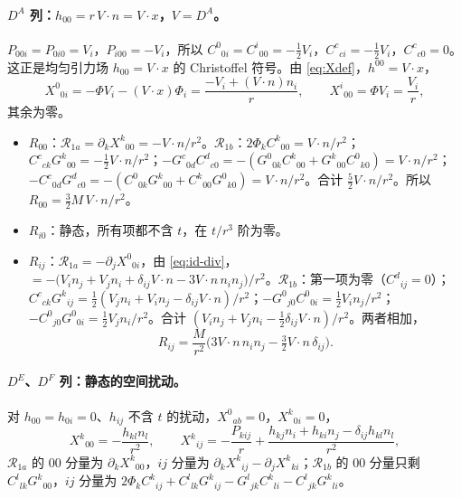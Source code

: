\documentclass[11pt,a4paper]{ctexart}
\numberwithin{equation}{section}
\begin{document}
\paragraph{$D^A$ 列：$h_{00}=r\,V\!\cdot n=V\!\cdot x$，$V=D^A$。}$P_{00i}=P_{0i0}=V_i$，$P_{i00}=-V_i$，所以 $C^0{}_{0i}=C^i{}_{00}=-\tfrac12V_i$，$C^c{}_{ci}=-\tfrac12V_i$，$C^c{}_{c0}=0$。这正是均匀引力场 $h_{00}=V\!\cdot x$ 的 Christoffel 符号。由 \eqref{eq:Xdef}，$h^{00}=V\!\cdot x$，
\begin{equation*}
X^0{}_{0i}=-\Phi V_i-(V\!\cdot x)\Phi_i=\frac{-V_i+(V\!\cdot n)n_i}{r},\qquad X^i{}_{00}=\Phi V_i=\frac{V_i}r,
\end{equation*}
其余为零。
\begin{itemize}
\item $R_{00}$：$\mathcal R_{1a}=\partial_kX^k{}_{00}=-V\!\cdot n/r^2$。$\mathcal R_{1b}$：$2\Phi_kC^k{}_{00}=V\!\cdot n/r^2$；$C^c{}_{ck}G^k{}_{00}=-\tfrac12V\!\cdot n/r^2$；$-G^c{}_{0d}C^d{}_{c0}=-(G^0{}_{0k}C^k{}_{00}+G^k{}_{00}C^0{}_{k0})=V\!\cdot n/r^2$；$-C^c{}_{0d}G^d{}_{c0}=-(C^0{}_{0k}G^k{}_{00}+C^k{}_{00}G^0{}_{k0})=V\!\cdot n/r^2$。合计 $\tfrac52V\!\cdot n/r^2$。所以 $R_{00}=\tfrac32M\,V\!\cdot n/r^2$。
\item $R_{i0}$：静态，所有项都不含 $t$，在 $t/r^3$ 阶为零。
\item $R_{ij}$：$\mathcal R_{1a}=-\partial_jX^0{}_{0i}$，由 \eqref{eq:id-div}，$=-\big(V_in_j+V_jn_i+\delta_{ij}V\!\cdot n-3V\!\cdot n\,n_in_j\big)/r^2$。$\mathcal R_{1b}$：第一项为零（$C^d{}_{ij}=0$）；$C^c{}_{ck}G^k{}_{ij}=\tfrac12(V_jn_i+V_in_j-\delta_{ij}V\!\cdot n)/r^2$；$-G^0{}_{j0}C^0{}_{0i}=\tfrac12V_in_j/r^2$；$-C^0{}_{j0}G^0{}_{0i}=\tfrac12V_jn_i/r^2$。合计 $(V_in_j+V_jn_i-\tfrac12\delta_{ij}V\!\cdot n)/r^2$。两者相加，
\begin{equation*}
R_{ij}=\frac{M}{r^2}\Big(3V\!\cdot n\,n_in_j-\tfrac32V\!\cdot n\,\delta_{ij}\Big).
\end{equation*}
\end{itemize}

\paragraph{$D^E$、$D^F$ 列：静态的空间扰动。}对 $h_{00}=h_{0i}=0$、$h_{ij}$ 不含 $t$ 的扰动，$X^0{}_{ab}=0$，$X^k{}_{0i}=0$，
\begin{equation}
X^k{}_{00}=-\frac{h_{kl}n_l}{r^2},\qquad
X^k{}_{ij}=-\frac{P_{kij}}{r}+\frac{h_{kj}n_i+h_{ki}n_j-\delta_{ij}h_{kl}n_l}{r^2},
\label{eq:Xspatial}
\end{equation}
$\mathcal R_{1a}$ 的 $00$ 分量为 $\partial_kX^k{}_{00}$，$ij$ 分量为 $\partial_kX^k{}_{ij}-\partial_jX^k{}_{ki}$；$\mathcal R_{1b}$ 的 $00$ 分量只剩 $C^l{}_{lk}G^k{}_{00}$，$ij$ 分量为 $2\Phi_kC^k{}_{ij}+C^l{}_{lk}G^k{}_{ij}-G^l{}_{jk}C^k{}_{li}-C^l{}_{jk}G^k{}_{li}$。
\end{document}
